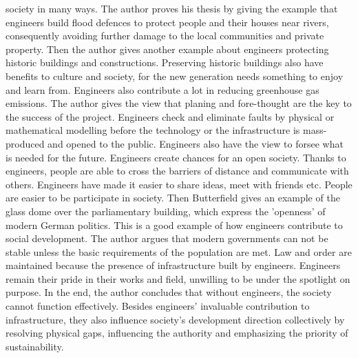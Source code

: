 \documentclass[12pt,a4]{article}
\begin{document}
society in many ways.
The author proves his thesis by giving the example that engineers build flood
defences to protect people and their houses near rivers, consequently avoiding
further damage to the local communities and private property.
Then the author gives another example about engineers protecting historic
buildings and constructions.
Preserving historic buildings also have benefits to culture and society, for the
new generation needs something to enjoy and learn from.
Engineers also contribute a lot in reducing greenhouse gas emissions.
%
%
The author gives the view that planing and fore-thought are the key to the
success of the project.
Engineers check and eliminate faults by physical or mathematical modelling
before the technology or the infrastructure is mass-produced and opened to the
public.
Engineers also have the view to forsee what is needed for the future.
%
%
Engineers create chances for an open society.
Thanks to engineers, people are able to cross the barriers of distance and
communicate with others.
Engineers have made it easier to share ideas, meet with friends etc.
People are easier to be participate in society.
Then Butterfield gives an example of the glass dome over the parliamentary
building, which express the 'openness' of modern German politics.
This is a good example of how engineers contribute to social development.
The author argues that modern governments can not be stable unless the basic
requirements of the population are met.
Law and order are maintained because the presence of infrastructure built by
engineers.
%
%
Engineers remain their pride in their works and field, unwilling to be under the
spotlight on purpose.
% 
%
In the end, the author concludes that without engineers, the society cannot
function effectively.
Besides engineers' invaluable contribution to infrastructure, they also
influence society's development direction collectively by resolving physical
gaps, influencing the authority and emphasizing the priority of sustainability.
%
%
%
%
%

\newpage


\end{document}
